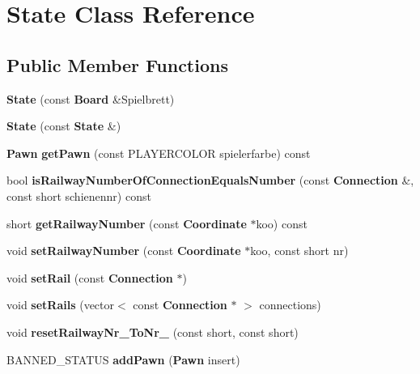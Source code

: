 \section{State Class Reference}
\label{class_state}
\subsection*{Public Member Functions}
\begin{DoxyCompactItemize}
\item 
{\bfseries State} (const {\bf Board} \&Spielbrett)\label{class_state_af4b0da86f50a141f59fe722fe2a521e5}

\item 
{\bfseries State} (const {\bf State} \&)\label{class_state_a5ca97340266d486dfa42225f19c40de3}

\item 
{\bf Pawn} {\bfseries get\-Pawn} (const P\-L\-A\-Y\-E\-R\-C\-O\-L\-O\-R spielerfarbe) const \label{class_state_a047b98fadf3b757656fa203e439d6c95}

\item 
bool {\bfseries is\-Railway\-Number\-Of\-Connection\-Equals\-Number} (const {\bf Connection} \&, const short schienennr) const \label{class_state_a0aab91520b80f52278908c673bb80779}

\item 
short {\bfseries get\-Railway\-Number} (const {\bf Coordinate} $\ast$koo) const \label{class_state_adaf456ffdedb803dc54820963568f9c5}

\item 
void {\bfseries set\-Railway\-Number} (const {\bf Coordinate} $\ast$koo, const short nr)\label{class_state_a92259aff86613b371d9f3c992868041c}

\item 
void {\bfseries set\-Rail} (const {\bf Connection} $\ast$)\label{class_state_aadc12f8c71adf85303cbfda99ba09178}

\item 
void {\bfseries set\-Rails} (vector$<$ const {\bf Connection} $\ast$ $>$ connections)\label{class_state_a32a25cd9178e12dce98d5b2c15d8a781}

\item 
void {\bfseries reset\-Railway\-Nr\-\_\-\-To\-Nr\-\_\-} (const short, const short)\label{class_state_a482b551469c15e5f88967ab6c42ca3dc}

\item 
B\-A\-N\-N\-E\-D\-\_\-\-S\-T\-A\-T\-U\-S {\bfseries add\-Pawn} ({\bf Pawn} insert)\label{class_state_a1f874b300f7f84742b5883f22d0db17f}


\end{DoxyCompactItemize}
